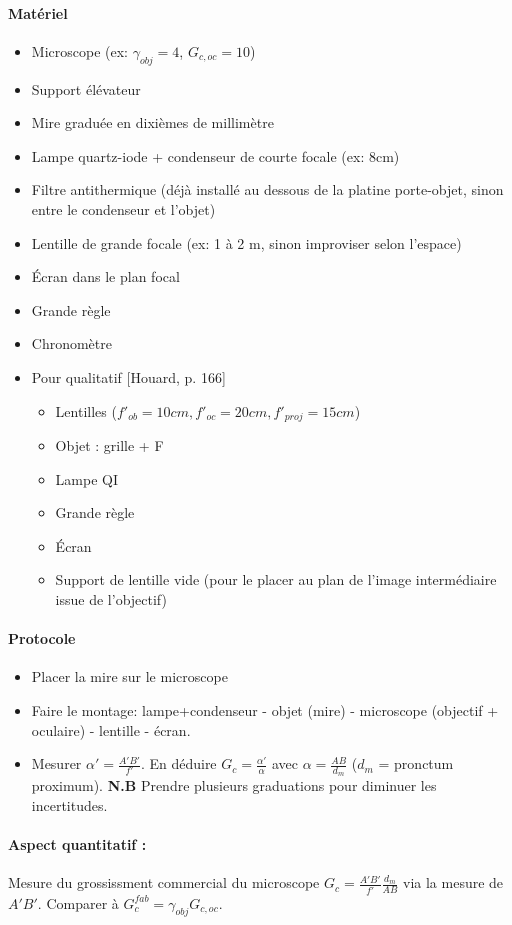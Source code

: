 \documentclass[11pt]{report}
\numberwithin{figure}{section}
\numberwithin{equation}{section}
\numberwithin{table}{section}
\newcommand{\1}{\boldsymbol{1}}
\begin{document}
\begin{tcolorbox}[breakable, enhanced, colback=red!2!white,colframe=mycolor!85!black,title=\textbf{\textbf{Expérience}}]
\paragraph*{Matériel}
\begin{itemize}
\item Microscope (ex: $\gamma_{obj} = 4$, $G_{c,oc} = 10$)
\item Support élévateur
\item Mire graduée en dixièmes de millimètre
\item Lampe quartz-iode + condenseur de courte focale (ex: 8cm)
\item Filtre antithermique (déjà installé au dessous de la platine porte-objet, sinon entre le condenseur et l'objet)
\item Lentille de grande focale (ex: 1 à 2 m, sinon improviser selon l'espace)
\item Écran dans le plan focal
\item Grande règle
\item Chronomètre
\item Pour qualitatif [Houard, p. 166]
\begin{itemize}
\item Lentilles ($f'_{ob} = 10cm, f'_{oc} = 20cm, f'_{proj} = 15cm$)
\item Objet : grille + F
\item Lampe QI
\item Grande règle
\item Écran
\item Support de lentille vide (pour le placer au plan de l'image intermédiaire issue de l'objectif)
\end{itemize} 
\end{itemize}

\paragraph*{Protocole } 

\begin{itemize}[label=$\triangleright$]
\item Placer la mire sur le microscope
		\item Faire le montage: lampe+condenseur - objet (mire) - microscope (objectif + oculaire) - lentille - écran.
		\item Mesurer $\alpha' = \frac{A'B'}{f'}$. En déduire $G_c = \frac{\alpha'}{\alpha}$ avec $\alpha = \frac{AB}{d_m}$ ($d_m$ = pronctum proximum). \textbf{N.B} Prendre plusieurs graduations pour diminuer les incertitudes.
\end{itemize}

\paragraph*{Aspect quantitatif :} Mesure du grossissment commercial du microscope $G_c =  \frac{A'B'}{f'} \frac{d_m}{AB}$ via la mesure de $A'B'$. Comparer à $G_c^{fab} = \gamma_{obj} G_{c,oc}$.


\end{tcolorbox}
\end{document}
